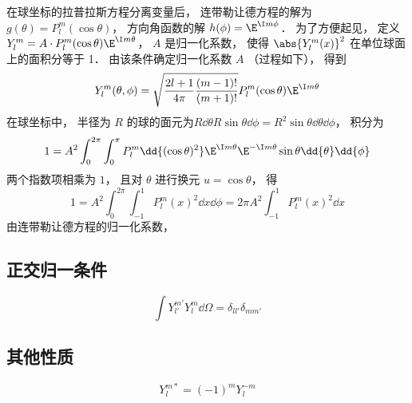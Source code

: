 

在球坐标的拉普拉斯方程分离变量后， 连带勒让德方程的解为 $g(\theta) = P_l^m(\cos\theta)$， 方向角函数的解 $h(\phi) = \E^{\I m\phi}$． 为了方便起见， 定义 $Y_l^m = A \cdot P_l^m(\cos \theta) \E^{\I m\theta}$， $A$ 是归一化系数， 使得 $\abs{Y_l^m (x)}^2$ 在单位球面上的面积分等于 1． 由该条件确定归一化系数 $A$ （过程如下）， 得到
\begin{equation}
Y_l^m (\theta ,\phi) = \sqrt{\frac{2l + 1}{4\pi }\frac{(m - 1)!}{(m + 1)!}} P_l^m (\cos\theta) \E^{\I m\theta}
\end{equation}
在球坐标中， 半径为 $R$ 的球的面元为$R \dd{\theta} R\sin\theta \dd{\phi} = R^2 \sin\theta \dd{\theta} \dd{\phi}$，  积分为
\begin{equation}
1 = A^2\int_0^{2\pi } \int_0^\pi  P_l^m \dd{(\cos \theta)^2} \E^{\I m\theta} \E^{-\I m\theta}\sin\theta \dd{\theta} \dd{\phi}
\end{equation}
两个指数项相乘为 $1$，  且对 $\theta$ 进行换元 $u = \cos\theta $， 得
\begin{equation}
1 = A^2 \int_0^{2\pi} \int_{-1}^1 P_l^m {{(x)}^2} \dd{x} \dd{\phi} = 2\pi A^2 \int_{-1}^1 P_l^m (x)^2 \dd{x} 
\end{equation}
由连带勒让德方程的归一化系数， %


\subsection{正交归一条件}
\begin{equation}
\int Y_{l'}^{m'} Y_l^m \dd{\Omega} = \delta_{ll'}\delta_{mm'}
\end{equation}

\subsection{其他性质}
\begin{equation}
Y_l^{m*} = (-1)^m Y_l^{-m}
\end{equation}
